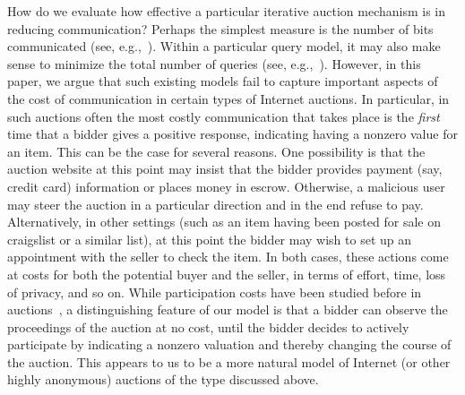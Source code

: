 \documentclass{aamas2013}
\begin{document}
How do we evaluate how effective a particular iterative auction mechanism
is in reducing communication?  Perhaps the simplest measure is the number
of bits communicated (see, e.g.,~\cite{Nisan05:Communication}).  Within a particular query
model, it may also make sense to minimize the total number of queries (see,
e.g.,~\cite{Lahaie04:Applying}). However, in this paper, we argue that such existing models
fail to capture important aspects of the cost of communication in certain
types of Internet auctions.  In particular, in such auctions often the most
costly communication that takes place is the {\em first} time that a bidder
gives a positive response, indicating having a nonzero value for an item.
This can be the case for several reasons.  One possibility is that the
auction website at this point may insist that the bidder provides payment
(say, credit card) information or places money in escrow.  Otherwise, a
malicious user may steer the auction in a particular direction and in the
end refuse to pay.  Alternatively, in other settings (such as an item
having been posted for sale on craigslist or a similar list), at this point
the bidder may wish to set up an appointment with the seller to check the
item.  In both cases, these actions come at costs for both the potential
buyer and the seller, in terms of effort, time, loss of privacy, and 
so on.
While participation costs have been studied before in
auctions~\cite{Stegeman95:ParticipationCost,
  Tan2006:EquilibriaParticipationCost}, a distinguishing feature of our
model is that a bidder can observe the proceedings of the auction at no
cost, until the bidder decides to actively participate by indicating a
nonzero valuation and thereby changing the course of the auction.   This
appears to us to be a more natural model of Internet (or other highly
anonymous) auctions of the type discussed above.
\end{document}

